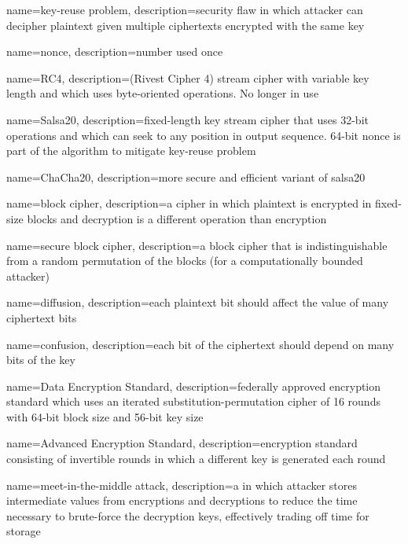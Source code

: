 {
    name={key-reuse problem},
    description={security flaw in which attacker can decipher plaintext given multiple ciphertexts encrypted with the same key}
}

{
    name={nonce},
    description={number used once}
}

{
    name={RC4},
    description={(Rivest Cipher 4) stream cipher with variable key length and which uses byte-oriented operations. No longer in use}
}

{
    name={Salsa20},
    description={fixed-length key stream cipher that uses 32-bit operations and which can seek to any position in output sequence. 64-bit \gls{nonce} is part of the algorithm to mitigate \gls{key-reuse problem}}
}

{
    name={ChaCha20},
    description={more secure and efficient variant of \gls{salsa20}}
}

{
    name={block cipher},
    description={a cipher in which plaintext is encrypted in fixed-size blocks and decryption is a different operation than encryption}
}

{
    name={secure block cipher},
    description={a block cipher that is indistinguishable from a random permutation of the blocks (for a computationally bounded attacker)}
}

{
    name={diffusion},
    description={each plaintext bit should affect the value of many ciphertext bits}
}

{
    name={confusion},
    description={each bit of the ciphertext should depend on many bits of the key}
}

{
    name={Data Encryption Standard},
    description={federally approved encryption standard which uses an iterated substitution\nobreakdash-permutation cipher of 16 rounds with 64-bit block size and 56-bit key size}
}

{
    name={Advanced Encryption Standard},
    description={encryption standard consisting of invertible rounds in which a different key is generated each round}
}

{
    name={meet-in-the-middle attack},
    description={a  in which attacker stores intermediate values from encryptions and decryptions to reduce the time necessary to brute-force the decryption keys, effectively trading off time for storage}
}

